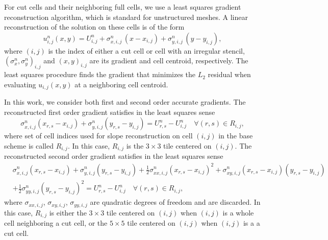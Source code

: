 For cut cells and their neighboring full cells, we use a least squares gradient reconstruction algorithm, which is standard for unstructured meshes.
A linear reconstruction of the solution on these cells is of the form
\begin{equation}
u^n_{i,j}(x,y) = U_{i,j}^n + \sigma^n_{x,i,j} \,(x-x_{i,j}) +
                     \sigma^n_{y,i,j}\,(y-y_{i,j}),
\label{eqn:lls}
\end{equation}
where $(i,j)$ is the index of either a cut cell or cell with an irregular stencil, $(\sigma^n_{x},\sigma^n_{y})_{i,j}$ and $(x,y)_{i,j}$ are its gradient and cell centroid, respectively. The least squares procedure finds the gradient that minimizes the $L_2$ residual when evaluating  $u_{i,j}(x,y)$ at a neighboring cell centroid. 

In this work, we consider both first and second order accurate gradients.  The reconstructed first order gradient satisfies in the least squares sense
\begin{equation}\label{eqn:linrecon_base}
\sigma^n_{x,i,j}(x_{r,s} - x_{i,j}) +
\sigma^n_{y,i,j}(y_{r,s} - y_{i,j})=
U^n_{r,s} - U^n_{i, j} \quad \forall (r,s) \in R_{i,j},
\end{equation}
where set of cell indices used for slope reconstruction on cell $(i,j)$ in the base scheme is called $R_{i,j}$.  In this case, $R_{i,j}$ is the $3\times 3$ tile centered on $(i,j)$.
The reconstructed second order gradient satisfies in the least squares sense
\begin{equation}
\begin{aligned}\label{eqn:linrecon_base2}
&\sigma^n_{x,i,j}(x_{r,s} - x_{i,j}) +
\sigma^n_{y,i,j}(y_{r,s} - y_{i,j})  + \frac{1}{2}\sigma^n_{xx,i,j}(x_{r,s} - x_{i,j})^2 +\sigma^n_{xy,i,j}(x_{r,s} - x_{i,j})(y_{r,s} - y_{i,j})\\
&+ \frac{1}{2}\sigma^n_{yy,i,j}(y_{r,s} - y_{i,j})^2=
U^n_{r,s} - U^n_{i, j} \quad \forall (r,s) \in R_{i,j},
\end{aligned}
\end{equation}
where $\sigma_{xx,i,j}$, $\sigma_{xy,i,j}$, $\sigma_{yy,i,j}$ are quadratic degrees of freedom and are discarded.  In this case, $R_{i,j}$ is either the $3\times 3$ tile centered on $(i,j)$ when $(i,j)$ is a whole cell neighboring a cut cell, or the $5\times 5$ tile centered on $(i,j)$ when $(i,j)$ is a a cut cell.

